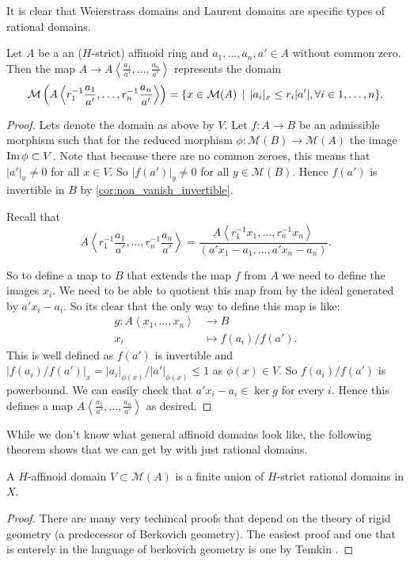 It is clear that Weierstrass domains and Laurent domains are specific types of rational domains. 
\begin{proposition}
	Let $A$ be a an ($H$-strict) affinoid ring and $a_1, \ldots, a_n, a' \in A$ without common zero.
	Then the map $A \to A\left<\frac{a_1}{a'}, \ldots, \frac{a_n}{a'} \right>$ represents the domain \[
		\mathcal{M} \left(A \left<r^{-1}_1\frac{a_1}{a'}, \ldots, r^{-1}_n\frac{a_n}{a'}\right> \right) = \{x \in \mathcal{M} (A) \st |a_i|_x \le r_i|a'|, \forall i \in 1, \ldots, n\} 
	.\] 
\end{proposition}
\begin{proof}
	Lets denote the domain as above by $V$. 
	Let $f:A \to B$ be an admissible morphism such that for the reduced morphism $\phi: \mathcal{M} (B) \to \mathcal{M} (A)$ the image $\operatorname{Im} \phi \subset  V$.
	Note that because there are no common zeroes, this means that $|a'|_x \ne 0$ for all $x \in V$. 
	So $|f(a')|_{y} \ne 0$ for all $y \in \mathcal{M} (B)$. 
	Hence $f(a')$ is invertible in $B$ by \cref{cor:non_vanish_invertible}. 

	Recall that \[
	A\left<r^{-1}_1\frac{a_1}{a'}, \ldots, r_n^{-1}\frac{a_n}{a'} \right> = \frac{A\left<r_1^{-1}x_1, \ldots, r_n^{-1}x_n \right>}{(a' x_1 - a_1, \ldots, a' x_n - a_n)}
	.\] 

	So to define a map to $B$ that extends the map $f$ from $A$ we need to define the images $x_i$. 
	We need to be able to quotient this map from by the ideal generated by $a'x_i - a_i$. 
	So its clear that the only way to define this map is like:
	\begin{align*}
		g: A\left<x_1, \ldots, x_n \right> &\longrightarrow B \\
		x_i &\longmapsto f(a_i) / f(a')
	.\end{align*}
	This is well defined as $f(a')$ is invertible and $|f(a_i) / f(a')|_x = |a_i|_{\phi(x)} / |a'|_{\phi(x)} \le 1$ as $\phi(x) \in V$. 
	So $f(a_i) / f(a')$ is powerbound. 
	We can easily check that $a'x_i - a_i \in \ker g$ for every $i$. Hence this defines a map $A \left<\frac{a_1}{a'}, \ldots, \frac{a_n}{a'} \right>$ as desired. 
\end{proof}

While we don't know what general affinoid domains look like, the following theorem shows that we can get by with just rational domains. 
\begin{proposition}
	A $H$-affinoid domain $V \subset  \mathcal{M} (A)$ is a finite union of $H$-strict rational domains in $X$.
\end{proposition}
\begin{proof}
	There are many very techincal proofs that depend on the theory of rigid geometry (a predecessor of Berkovich geometry).
	The easiest proof and one that is enterely in the language of berkovich geometry is one by Temkin \cite{temkinNewProofGerritzenGrauert2005}.
\end{proof}





